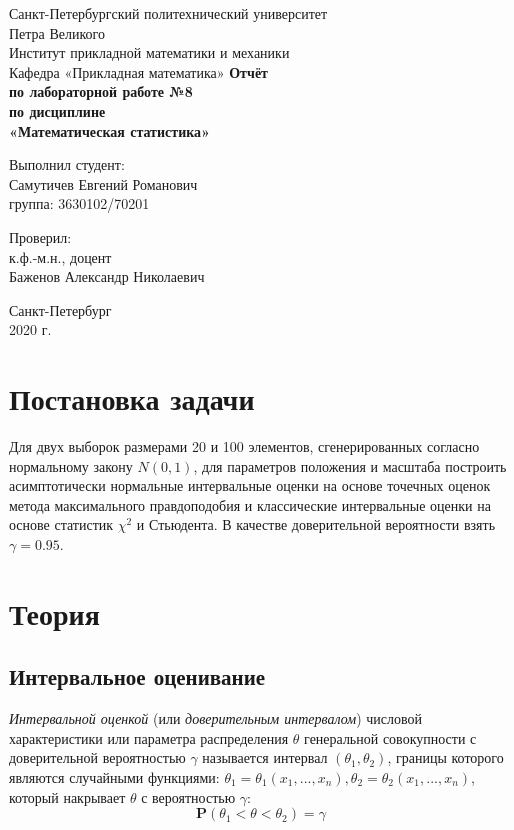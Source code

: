 \documentclass[12pt,a4paper]{article}
\begin{document}
	
\begin{titlepage}
	\begin{center}		
		\vfill	
		Санкт-Петербургский политехнический университет \\
		Петра Великого\\
		\vskip 1cm
		Институт прикладной математики и механики \\
		Кафедра «Прикладная математика»
		\vfill
		\textbf{Отчёт\\
			по лабораторной работе №8\\
			по дисциплине\\
			«Математическая статистика»\\}
		\vfill
	\end{center}
	\vfill
	\hfill
	\begin{minipage}{0.4\textwidth}
		Выполнил студент:\\
		Самутичев Евгений Романович\\
		группа: 3630102/70201\\
	\end{minipage}
	\vfill
	\hfill 
	\begin{minipage}{0.4\textwidth}
		Проверил:\\
		к.ф.-м.н., доцент\\
		Баженов Александр Николаевич\
	\end{minipage}
	\vfill
	\begin{center}
		Санкт-Петербург\\2020 г.
	\end{center}
\end{titlepage}

\tableofcontents
\listoftables
\pagebreak

\section{Постановка задачи}
Для двух выборок размерами 20 и 100 элементов, сгенерированных согласно нормальному закону $N(0, 1)$, для параметров положения и масштаба построить асимптотически нормальные интервальные оценки на основе точечных оценок метода максимального правдоподобия и классические интервальные оценки на основе статистик $\chi^2$ и Стьюдента. В качестве доверительной вероятности взять $\gamma = 0.95$.
\pagebreak

\section{Теория}
\subsection{Интервальное оценивание}
\textit{Интервальной оценкой} (или \textit{доверительным интервалом}) числовой характеристики или параметра распределения $\theta$ генеральной совокупности с доверительной вероятностью $\gamma$ называется интервал $(\theta_1, \theta_2)$, границы которого являются случайными функциями: $\theta_1 = \theta_1 (x_1, ..., x_n), \theta_2 = \theta_2 (x_1, ..., x_n)$, который накрывает $\theta$ с вероятностью $\gamma$:
\begin{equation}
	\mathbf{P}(\theta_1 < \theta < \theta_2) = \gamma
\end{equation}
\end{document}
